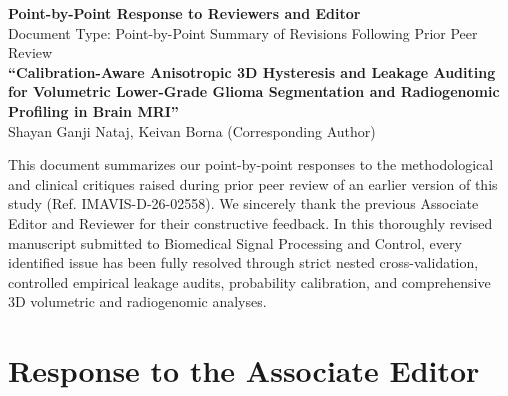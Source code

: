 \documentclass[11pt]{article}
\begin{document}
\thispagestyle{empty}

\begin{center}
{\Large \textbf{Point-by-Point Response to Reviewers and Editor}}\\[0.6em]
{\large Document Type: Point-by-Point Summary of Revisions Following Prior Peer Review}\\[0.4em]
\textbf{``Calibration-Aware Anisotropic 3D Hysteresis and Leakage Auditing for Volumetric Lower-Grade Glioma Segmentation and Radiogenomic Profiling in Brain MRI''}\\[0.4em]
Shayan Ganji Nataj, Keivan Borna (Corresponding Author)
\end{center}

\vspace{1.0em}
\noindent
This document summarizes our point-by-point responses to the methodological and clinical critiques raised during prior peer review of an earlier version of this study (Ref. IMAVIS-D-26-02558). We sincerely thank the previous Associate Editor and Reviewer for their constructive feedback. In this thoroughly revised manuscript submitted to Biomedical Signal Processing and Control, every identified issue has been fully resolved through strict nested cross-validation, controlled empirical leakage audits, probability calibration, and comprehensive 3D volumetric and radiogenomic analyses.

\section*{Response to the Associate Editor}
\end{document}
